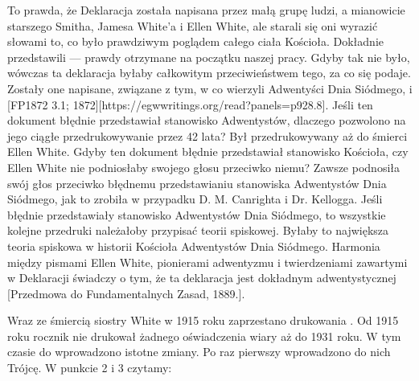 To prawda, że Deklaracja  została napisana przez małą grupę ludzi, a mianowicie starszego Smitha, Jamesa White'a i Ellen White, ale starali się oni wyrazić słowami to, co było prawdziwym poglądem całego ciała Kościoła. Dokładnie przedstawili  — prawdy otrzymane na początku naszej pracy. Gdyby tak nie było, wówczas ta deklaracja byłaby całkowitym przeciwieństwem tego, za co się podaje. Zostały one napisane,  związane z tym, w co wierzyli Adwentyści Dnia Siódmego,  i [FP1872 3.1; 1872][https://egwwritings.org/read?panels=p928.8]. Jeśli ten dokument błędnie przedstawiał stanowisko Adwentystów, dlaczego pozwolono na jego ciągłe przedrukowywanie przez 42 lata? Był przedrukowywany aż do śmierci Ellen White. Gdyby ten dokument błędnie przedstawiał stanowisko Kościoła, czy Ellen White nie podniosłaby swojego głosu przeciwko niemu? Zawsze podnosiła swój głos przeciwko błędnemu przedstawianiu stanowiska Adwentystów Dnia Siódmego, jak to zrobiła w przypadku D. M. Canrighta i Dr. Kellogga. Jeśli  błędnie przedstawiały stanowisko Adwentystów Dnia Siódmego, to wszystkie kolejne przedruki należałoby przypisać teorii spiskowej. Byłaby to największa teoria spiskowa w historii Kościoła Adwentystów Dnia Siódmego. Harmonia między pismami Ellen White, pionierami adwentyzmu i twierdzeniami zawartymi w Deklaracji  świadczy o tym, że ta deklaracja jest dokładnym  adwentystycznej [Przedmowa do Fundamentalnych Zasad, 1889.].

Wraz ze śmiercią siostry White w 1915 roku zaprzestano drukowania . Od 1915 roku rocznik nie drukował żadnego oświadczenia wiary aż do 1931 roku. W tym czasie do  wprowadzono istotne zmiany. Po raz pierwszy wprowadzono do nich Trójcę. W punkcie 2 i 3 czytamy:


